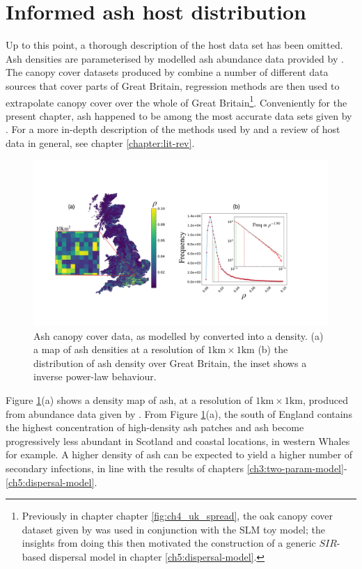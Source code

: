\section{Informed ash host distribution}

Up to this point, a thorough description of the host data set has been omitted. Ash densities are parameterised by modelled ash abundance data provided by \cite{hill.data}. The canopy cover datasets produced by \cite{hill.data} combine a number of different data sources that cover parts of Great Britain, regression methods are then used to extrapolate canopy cover over the whole of Great Britain\footnote{Previously in chapter chapter \ref{fig:ch4_uk_spread}, the oak canopy cover dataset given by \cite{hill.data} was used in conjunction with the SLM toy model; the insights from doing this then motivated the construction of a generic $SIR$-based dispersal model in chapter \ref{ch5:dispersal-model}.}. Conveniently for the present chapter, ash happened to be among the most accurate data sets given by \cite{hill.data}. For a more in-depth description of the methods used by \cite{hill.data} and a review of host data in general, see chapter \ref{chapter:lit-rev}.

\begin{figure}
    \centering
    \includegraphics[scale=0.30]{chapter6/figures/fig3-ash-data.pdf}
    \caption{Ash canopy cover data, as modelled by \cite{hill.data} converted into a density. (a) a map of ash densities at a resolution of $1\mathrm{km} \times 1\mathrm{km}$ (b) the distribution of ash density over Great Britain, the inset shows a inverse power-law behaviour.}
    \label{fig:ash-host-data}
\end{figure}

Figure \ref{fig:ash-host-data}(a) shows a density map of ash, at a resolution of $\mathrm{1km}\times \mathrm{1km}$, produced from abundance data given by \cite{hill.data}. From Figure \ref{fig:ash-host-data}(a), the south of England contains the highest concentration of high-density ash patches and ash become progressively less abundant in Scotland and coastal locations, in western Whales for example. A higher density of ash can be expected to yield a higher number of secondary infections, in line with the results of chapters \ref{ch3:two-param-model}-\ref{ch5:dispersal-model}.
 

